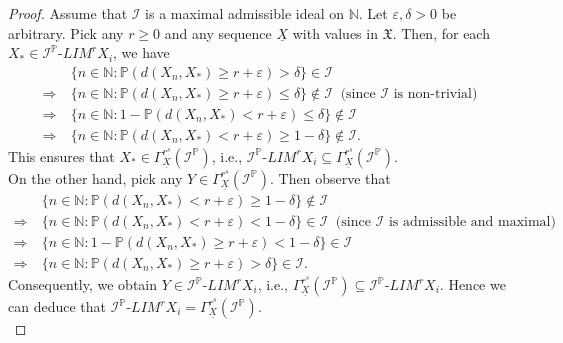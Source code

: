 \documentclass[10pt,a4paper]{amsart}
\begin{document}
\begin{proof}
	Assume that $\mathcal{I}$ is a maximal admissible ideal on $\mathbb{N}$. Let $\varepsilon,\delta>0$ be arbitrary.
Pick any $r\geq 0$ and any sequence $\underline{X}$ with values in $\mathfrak{X}$. Then, for each $X_*\in\mathcal{I}^{\mathbb{P}}$-$LIM^rX_i$, we have 
\begin{align*}
	&\{n\in\mathbb{N}:\mathbb{P}(d(X_n,X_*)\geq r+\varepsilon)>\delta\}\in\mathcal{I}\\
	\Rightarrow~& \{n\in\mathbb{N}:\mathbb{P}(d(X_n,X_*)\geq r+\varepsilon)\leq\delta\}\notin\mathcal{I}~\mbox{ (since $\mathcal{I}$ is non-trivial)}\\
	\Rightarrow~& \{n\in\mathbb{N}:1-\mathbb{P}(d(X_n,X_*)< r+\varepsilon)\leq\delta\}\notin\mathcal{I}\\
\Rightarrow~& \{n\in\mathbb{N}:\mathbb{P}(d(X_n,X_*)< r+\varepsilon)\geq 1-\delta\}\notin\mathcal{I}.
\end{align*}
This ensures that $X_*\in \Gamma^{r^s}_{\underline{X}}(\mathcal{I}^{\mathbb{P}})$, i.e., $\mathcal{I}^{\mathbb{P}}$-$LIM^rX_i\subseteq\Gamma^{r^s}_{\underline{X}}(\mathcal{I}^{\mathbb{P}})$.\\

On the other hand, pick any $Y\in\Gamma^{r^s}_{\underline{X}}(\mathcal{I}^{\mathbb{P}})$. Then observe that 
\begin{align*}
	&\{n\in\mathbb{N}:\mathbb{P}(d(X_n,X_*)< r+\varepsilon)\geq 1-\delta\}\notin\mathcal{I}\\
	\Rightarrow~& \{n\in\mathbb{N}:\mathbb{P}(d(X_n,X_*)< r+\varepsilon)<1-\delta\}\in\mathcal{I}~\mbox{ (since $\mathcal{I}$ is admissible and maximal)}\\
	\Rightarrow~& \{n\in\mathbb{N}:1-\mathbb{P}(d(X_n,X_*)\geq r+\varepsilon)<1-\delta\}\in\mathcal{I}\\
	\Rightarrow~& \{n\in\mathbb{N}:\mathbb{P}(d(X_n,X_*)\geq r+\varepsilon)>\delta\}\in\mathcal{I}.
\end{align*}
Consequently, we obtain $Y\in\mathcal{I}^{\mathbb{P}}$-$LIM^rX_i$, i.e., $\Gamma^{r^s}_{\underline{X}}(\mathcal{I}^{\mathbb{P}})\subseteq \mathcal{I}^{\mathbb{P}}$-$LIM^rX_i$. Hence we can deduce that $\mathcal{I}^{\mathbb{P}}$-$LIM^rX_i=\Gamma^{r^s}_{\underline{X}}(\mathcal{I}^{\mathbb{P}})$.\\


\end{proof}
\end{document}
